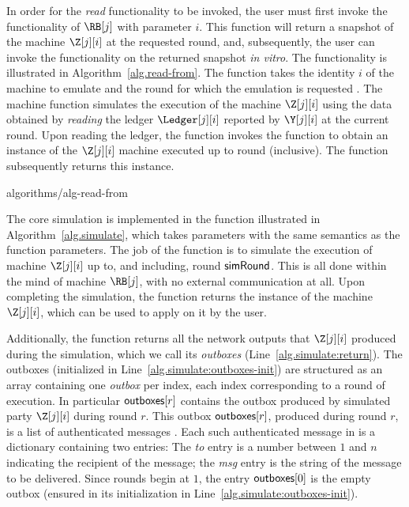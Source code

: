 In order for the \emph{read} functionality to be invoked, the user must first
invoke the \emulateMachine functionality of $\RB[j]$ with parameter $i$.
This function will return a snapshot of the machine $\Z[j][i]$ at the requested
round, and, subsequently, the user can invoke the \lread functionality on
the returned snapshot \emph{in vitro}.
The \emulateMachine functionality is illustrated in Algorithm~\ref{alg.read-from}.
The \emulateMachine function takes the identity $i$ of the machine to emulate
and the round for which the emulation is requested
\simulationRound.
The \emulateMachine machine function simulates the execution of the machine
$\Z[j][i]$ using the data obtained by \emph{reading} the ledger $\Ledger[j][i]$
reported by $\Y[j][i]$ at the current round. Upon reading the ledger,
the \emulateMachine function invokes the \simulate function to obtain an instance
of the $\Z[j][i]$ machine executed up to round \simulationRound (inclusive).
The \emulateMachine function subsequently returns this instance.

{algorithms/alg-read-from}

The core simulation is implemented in the function \simulate illustrated in
Algorithm~\ref{alg.simulate}, which takes parameters with the same semantics as
the \emulateMachine function parameters. The job of the \simulate function
is to simulate the execution of machine $\Z[j][i]$ up to, and including, round
$\textsf{simRound}$. This is all done within the mind of machine $\RB[j]$,
with no external communication at all. Upon completing the simulation,
the \simulate function returns the instance of the machine $\Z[j][i]$,
which can be used to apply \lread on it by the user.

Additionally, the
\simulate function returns all the network outputs that $\Z[j][i]$
produced during the simulation, which we call its \emph{outboxes}
(Line~\ref{alg.simulate:return}). The outboxes (initialized in
Line~\ref{alg.simulate:outboxes-init}) are structured as an array
containing one \emph{outbox} per index, each index corresponding to
a round of execution. In particular $\textsf{outboxes}[r]$ contains the
outbox produced by simulated party $\Z[j][i]$ during round $r$.
This outbox $\textsf{outboxes}[r]$, produced during round $r$, is a list
of authenticated messages \netouts. Each such authenticated
message \netout in \netouts is a dictionary containing two entries:
The \emph{to} entry is a number between $1$ and $n$
indicating the recipient of the message; the \emph{msg}
entry is the string of the message to be delivered.
Since rounds begin at $1$, the entry $\textsf{outboxes}[0]$ is the
empty outbox (ensured in its initialization in
Line~\ref{alg.simulate:outboxes-init}).

